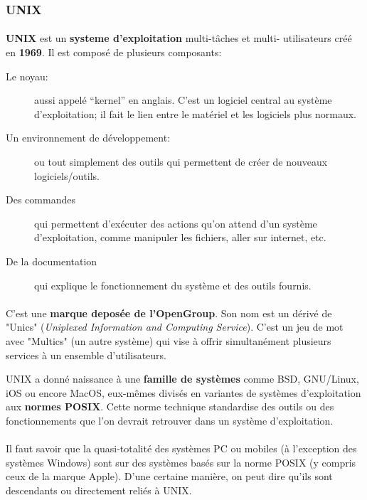 \subsubsection{UNIX}

\paragraph{} \textbf{UNIX} est un \textbf{systeme d'exploitation} multi-tâches
et multi- utilisateurs créé en \textbf{1969}. Il est composé de plusieurs
composants:

\begin{description}
	\item[Le noyau:] aussi appelé ``kernel'' en anglais. C'est un logiciel
		central au système d'exploitation; il fait le lien entre le matériel et
		les logiciels plus normaux.
	\item[Un environnement de développement:] ou tout simplement des outils qui
		permettent de créer de nouveaux logiciels/outils.
	\item[Des commandes] qui permettent d'exécuter des actions qu'on attend
		d'un système d'exploitation, comme manipuler les fichiers, aller sur
		internet, etc.
	\item[De la documentation] qui explique le fonctionnement du système et des
		outils fournis.
\end{description}

\paragraph{} C'est une \textbf{marque deposée de l'OpenGroup}. Son nom est un
dérivé de "Unics" (\textit{Uniplexed Information and Computing Service}). C'est
un jeu de mot avec "Multics" (un autre système) qui vise à offrir simultanément
plusieurs services à un ensemble d'utilisateurs.

UNIX a donné naissance à une \textbf{famille de systèmes} comme BSD, GNU/Linux,
iOS ou encore MacOS, eux-mêmes divisés en variantes de systèmes d'exploitation
aux \textbf{normes POSIX}. Cette norme technique standardise des outils ou des
fonctionnements que l'on devrait retrouver dans un système d'exploitation.

\paragraph{} Il faut savoir que la quasi-totalité des systèmes PC ou mobiles (à
l'exception des systèmes Windows) sont sur des systèmes basés sur la norme POSIX (y compris
ceux de la marque Apple). D'une certaine manière, on peut dire qu'ils sont
descendants ou directement reliés à UNIX.

